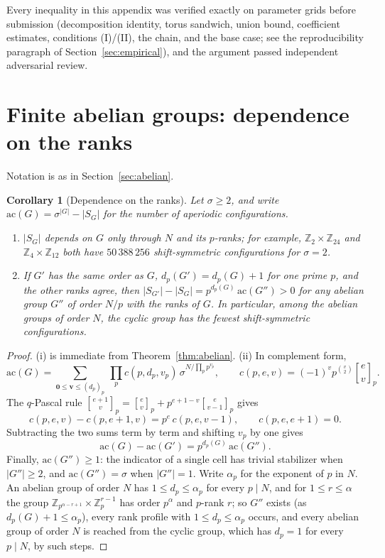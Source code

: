 \documentclass[11pt,a4paper]{article}
\newtheorem{corollary}[theorem]{Corollary}
\theoremstyle{remark}
\newcommand{\ZZ}{\mathbb{Z}}
\newcommand{\vv}{\mathbf{v}}
\newcommand{\gaussbinom}[2]{\genfrac{[}{]}{0pt}{}{#1}{#2}}
\begin{document}
Every inequality in this appendix was verified exactly on parameter grids
before submission (decomposition identity, torus sandwich, union bound,
coefficient estimates, conditions (I)/(II), the chain, and the base case;
see the reproducibility paragraph of Section~\ref{sec:empirical}), and the
argument passed independent adversarial review.

\section{Finite abelian groups: dependence on the ranks}\label{app:abelian}

Notation is as in Section~\ref{sec:abelian}.

\begin{corollary}[Dependence on the ranks]\label{cor:abelian-ranks}
Let $\sigma\ge2$, and write $\mathrm{ac}(G)=\sigma^{|G|}-|S_G|$ for the number of
aperiodic configurations.
\begin{enumerate}[label=(\roman*)]
\item $|S_G|$ depends on $G$ only through $N$ and its $p$-ranks; for
example, $\ZZ_2\times\ZZ_{24}$ and $\ZZ_4\times\ZZ_{12}$ both have $50\,388\,256$
shift-symmetric configurations for $\sigma=2$.
\item If $G'$ has the same order as $G$, $d_p(G')=d_p(G)+1$ for one prime
$p$, and the other ranks agree, then
$|S_{G'}|-|S_G|=p^{d_p(G)}\,\mathrm{ac}(G'')>0$ for any abelian group $G''$ of
order $N/p$ with the ranks of $G$. In particular, among the abelian groups
of order $N$, the cyclic group has the fewest shift-symmetric
configurations.
\end{enumerate}
\end{corollary}

\begin{proof}
(i) is immediate from Theorem~\ref{thm:abelian}. (ii) In complement form,
\[
  \mathrm{ac}(G)=\sum_{\mathbf 0\le\vv\le(d_p)_p}\ \prod_p c(p,d_p,v_p)\,
  \sigma^{N/\prod_p p^{v_p}},\qquad
  c(p,e,v)=(-1)^vp^{\binom v2}\gaussbinom ev_p .
\]
The $q$-Pascal rule
$\gaussbinom{e+1}v_p=\gaussbinom ev_p+p^{e+1-v}\gaussbinom e{v-1}_p$ gives
\[
  c(p,e,v)-c(p,e+1,v)=p^e\,c(p,e,v-1),\qquad c(p,e,e+1)=0 .
\]
Subtracting the two sums term by term and shifting $v_p$ by one gives
\[\mathrm{ac}(G)-\mathrm{ac}(G')=p^{d_p(G)}\,\mathrm{ac}(G'').\]
Finally, $\mathrm{ac}(G'')\ge1$: the indicator of a single cell has trivial
stabilizer when $|G''|\ge2$, and $\mathrm{ac}(G'')=\sigma$ when $|G''|=1$. Write
$\alpha_p$ for the exponent of $p$ in $N$. An abelian group of order $N$ has
$1\le d_p\le\alpha_p$ for every $p\mid N$, and for $1\le r\le\alpha$ the group
$\ZZ_{p^{\alpha-r+1}}\times\ZZ_p^{r-1}$ has order $p^\alpha$ and $p$-rank $r$; so
$G''$ exists (as $d_p(G)+1\le\alpha_p$), every rank profile with
$1\le d_p\le\alpha_p$ occurs, and every abelian group of order $N$ is
reached from the cyclic group, which has $d_p=1$ for every $p\mid N$, by
such steps.
\end{proof}
\end{document}
